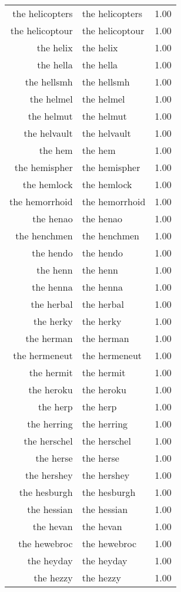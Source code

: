\begin{table}[ht]
\begin{tabular}{rlr}
  the helicopters & the helicopters & 1.00 \\ 
  the helicoptour & the helicoptour & 1.00 \\ 
  the helix & the helix & 1.00 \\ 
  the hella & the hella & 1.00 \\ 
  the hellsmh & the hellsmh & 1.00 \\ 
  the helmel & the helmel & 1.00 \\ 
  the helmut & the helmut & 1.00 \\ 
  the helvault & the helvault & 1.00 \\ 
  the hem & the hem & 1.00 \\ 
  the hemispher & the hemispher & 1.00 \\ 
  the hemlock & the hemlock & 1.00 \\ 
  the hemorrhoid & the hemorrhoid & 1.00 \\ 
  the henao & the henao & 1.00 \\ 
  the henchmen & the henchmen & 1.00 \\ 
  the hendo & the hendo & 1.00 \\ 
  the henn & the henn & 1.00 \\ 
  the henna & the henna & 1.00 \\ 
  the herbal & the herbal & 1.00 \\ 
  the herky & the herky & 1.00 \\ 
  the herman & the herman & 1.00 \\ 
  the hermeneut & the hermeneut & 1.00 \\ 
  the hermit & the hermit & 1.00 \\ 
  the heroku & the heroku & 1.00 \\ 
  the herp & the herp & 1.00 \\ 
  the herring & the herring & 1.00 \\ 
  the herschel & the herschel & 1.00 \\ 
  the herse & the herse & 1.00 \\ 
  the hershey & the hershey & 1.00 \\ 
  the hesburgh & the hesburgh & 1.00 \\ 
  the hessian & the hessian & 1.00 \\ 
  the hevan & the hevan & 1.00 \\ 
  the hewebroc & the hewebroc & 1.00 \\ 
  the heyday & the heyday & 1.00 \\ 
  the hezzy & the hezzy & 1.00 \\ 

\end{tabular}
\end{table}
